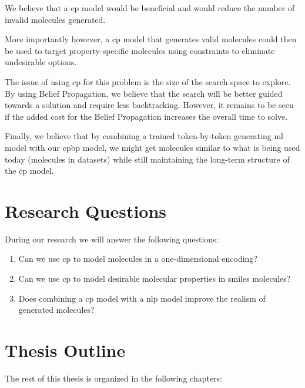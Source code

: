 \documentclass[../Document.tex]{subfiles}
\begin{document}
We believe that a \gls{cp} model would be beneficial and would reduce the number of invalid molecules generated.

More importantly however, a \gls{cp} model that generates valid molecules could then be used to target property-specific molecules using constraints to eliminate undesirable options.

The issue of using \gls{cp} for this problem is the size of the search space to explore. By using Belief Propagation, we believe that the search will be better guided towards a solution and require less backtracking. However, it remains to be seen if the added cost for the Belief Propagation increases the overall time to solve.

Finally, we believe that by combining a trained token-by-token generating \gls{ml} model with our \gls{cpbp} model, we might get molecules similar to what is being used today (molecules in datasets) while still maintaining the long-term structure of the \gls{cp} model.


\section{Research Questions}
\label{sec:intro/questions}
During our research we will answer the following questions:

\begin{enumerate}
    \item Can we use \acrshort{cp} to model molecules in a one-dimensional encoding?
    \item Can we use \acrshort{cp} to model desirable molecular properties in \acrshort{smiles} molecules?
    \item Does combining a \acrshort{cp} model with a \acrshort{nlp} model improve the realism of generated molecules?
\end{enumerate}

\section{Thesis Outline}
\label{sec:intro/outline}
The rest of this thesis is organized in the following chapters:
\end{document}
